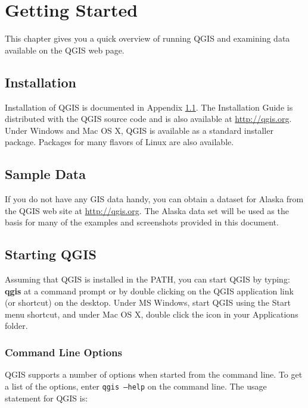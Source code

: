 \section{Getting Started}\label{label_getstarted}

This chapter gives you a quick overview of running QGIS and examining data
available on the QGIS web page.


\subsection{Installation}\label{label_installation}

Installation of QGIS is documented in Appendix \ref{label_installation}. The
Installation Guide is distributed with the QGIS source code and is also
available at \url{http://qgis.org}. Under Windows and Mac OS X, QGIS is
available as a standard installer package. Packages for
many flavors of Linux are also available. 


\subsection{Sample Data}\label{label_sampledata}

If you do not have any GIS data handy, you can obtain a
dataset for Alaska from the QGIS web site at \url{http://qgis.org}. The
Alaska data set will be used as the basis for many of the examples and
screenshots provided in this document.


\subsection{Starting QGIS}\label{label_startinqgis}

Assuming that QGIS is installed in the PATH, you can start QGIS by typing:
\textbf{qgis}  at a command prompt or by double clicking on the QGIS
application link (or shortcut) on the desktop. Under MS Windows, start QGIS
using the Start menu shortcut, and under Mac OS X, double click the icon in
your Applications folder. 

\subsubsection{Command Line Options}
\label{label_commandline}

QGIS supports a number of options when started from the command line. To
get a list of the options, enter \texttt{qgis ---help} on the command line.
The usage statement for QGIS is:

